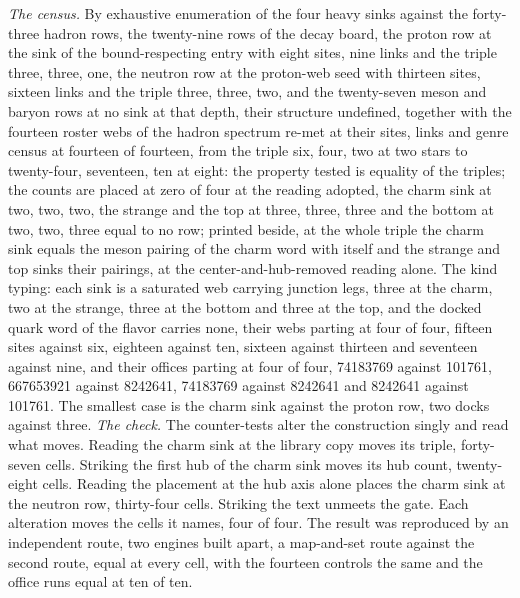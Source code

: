 \begin{chproof}
\textit{The census.} By exhaustive enumeration of the four heavy sinks against the forty-three hadron rows, the twenty-nine rows of the decay board, the proton row at the sink of the bound-respecting entry with eight sites, nine links and the triple three, three, one, the neutron row at the proton-web seed with thirteen sites, sixteen links and the triple three, three, two, and the twenty-seven meson and baryon rows at no sink at that depth, their structure undefined, together with the fourteen roster webs of the hadron spectrum re-met at their sites, links and genre census at fourteen of fourteen, from the triple six, four, two at two stars to twenty-four, seventeen, ten at eight: the property tested is equality of the triples; the counts are placed at zero of four at the reading adopted, the charm sink at two, two, two, the strange and the top at three, three, three and the bottom at two, two, three equal to no row; printed beside, at the whole triple the charm sink equals the meson pairing of the charm word with itself and the strange and top sinks their pairings, at the center-and-hub-removed reading alone. The kind typing: each sink is a saturated web carrying junction legs, three at the charm, two at the strange, three at the bottom and three at the top, and the docked quark word of the flavor carries none, their webs parting at four of four, fifteen sites against six, eighteen against ten, sixteen against thirteen and seventeen against nine, and their offices parting at four of four, 74183769 against 101761, 667653921 against 8242641, 74183769 against 8242641 and 8242641 against 101761. The smallest case is the charm sink against the proton row, two docks against three.
\textit{The check.} The counter-tests alter the construction singly and read what moves. Reading the charm sink at the library copy moves its triple, forty-seven cells. Striking the first hub of the charm sink moves its hub count, twenty-eight cells. Reading the placement at the hub axis alone places the charm sink at the neutron row, thirty-four cells. Striking the text unmeets the gate. Each alteration moves the cells it names, four of four. The result was reproduced by an independent route, two engines built apart, a map-and-set route against the second route, equal at every cell, with the fourteen controls the same and the office runs equal at ten of ten.
\begin{figure}[h]\centering{}
\end{figure}
\end{chproof}
